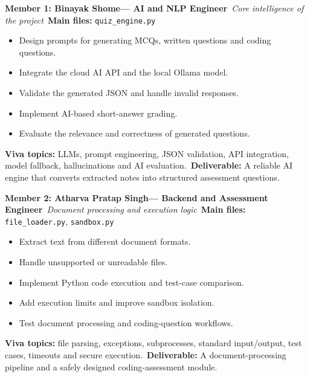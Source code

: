 \documentclass[12pt, a4paper]{report}
\newcommand{\MemberOne}{Binayak Shome}   \newcommand{\RollOne}{23051338}
\newcommand{\MemberTwo}{Atharva Pratap Singh}   \newcommand{\RollTwo}{23052068}
\begin{document}
\noindent \textbf{Member 1: \MemberOne --- AI and NLP Engineer}\
\textit{Core intelligence of the project}\
\textbf{Main files:} \texttt{quiz\_engine.py}
\begin{itemize}
\setlength{\itemsep}{0pt}
\item Design prompts for generating MCQs, written questions and coding questions.
\item Integrate the cloud AI API and the local Ollama model.
\item Validate the generated JSON and handle invalid responses.
\item Implement AI-based short-answer grading.
\item Evaluate the relevance and correctness of generated questions.
\end{itemize}
\noindent \textbf{Viva topics:} LLMs, prompt engineering, JSON validation, API integration, model fallback, hallucinations and AI evaluation.\
\textbf{Deliverable:} A reliable AI engine that converts extracted notes into structured assessment questions.
\vspace*{0.4cm}

\noindent \textbf{Member 2: \MemberTwo --- Backend and Assessment Engineer}\
\textit{Document processing and execution logic}\
\textbf{Main files:} \texttt{file\_loader.py}, \texttt{sandbox.py}
\begin{itemize}
\setlength{\itemsep}{0pt}
\item Extract text from different document formats.
\item Handle unsupported or unreadable files.
\item Implement Python code execution and test-case comparison.
\item Add execution limits and improve sandbox isolation.
\item Test document processing and coding-question workflows.
\end{itemize}
\noindent \textbf{Viva topics:} file parsing, exceptions, subprocesses, standard input/output, test cases, timeouts and secure execution.\
\textbf{Deliverable:} A document-processing pipeline and a safely designed coding-assessment module.
\vspace*{0.4cm}
\end{document}
